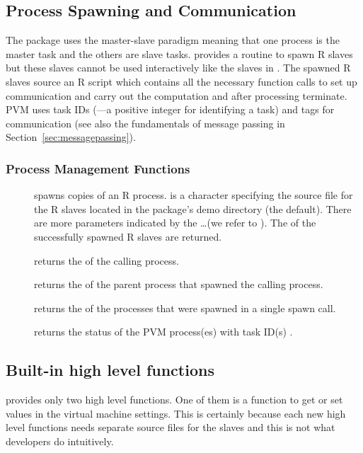 \subsection{Process Spawning and Communication}

The package  uses the master-slave paradigm meaning that one
process is the master task and the others are slave tasks. 
provides a routine to spawn R slaves but these slaves cannot be used
interactively like the slaves in . The spawned R slaves
source an R script which contains all the necessary function calls to
set up communication and carry out the computation and after
processing terminate.
PVM uses task IDs (---a positive integer for identifying a task)
and tags for communication (see
also the fundamentals of message passing in
Section~\ref{sec:messagepassing}).

\subsubsection{Process Management  Functions}
\begin{description}
\item[] spawns 
  copies of an  R process.  is a character
  specifying the source file for the R slaves located in the package's
  demo directory (the default). There are more
  parameters indicated by the \ldots (we refer to
  \cite{nali07rpvm}). The  of the successfully spawned R
  slaves are returned.
\item[] returns the  of the calling
  process.
\item[] returns the  of the parent
  process that spawned the calling process.
\item[] returns the  of the processes
  that were spawned in a single spawn call.
\item[] returns the status of the PVM
  process(es) with task ID(s) .
\end{description}

\subsection{Built-in high level functions}

 provides only two high level functions. One of them is a
function to get or set values in the virtual machine settings. This is
certainly because each new high level functions needs separate source
files for the slaves and this is not what developers do intuitively. 

